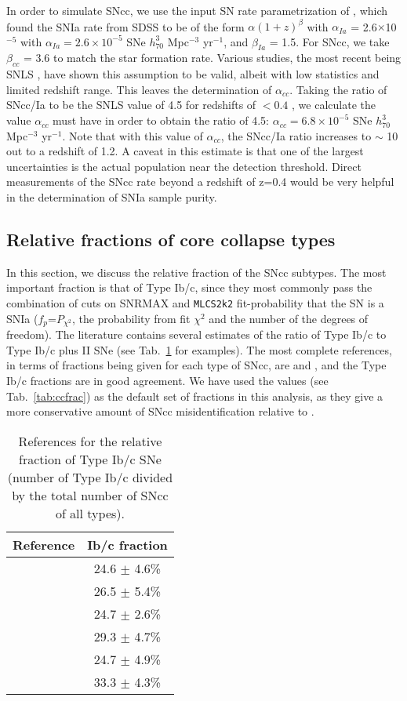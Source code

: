 \documentclass[preprint2]{aastex}    %
\newcommand{\mlcs}{{\tt MLCS2k2}}
\begin{document}
In order to simulate SNcc, we use the input
SN rate parametrization of \cite{dil08}, which found the SNIa rate from SDSS to be of the
form $\alpha(1+z)^{\beta}$ with $\alpha_{Ia}$ = 2.6$\times$10$^{-5}$
with $\alpha_{Ia} = 2.6\times 10^{-5}$ SNe $h_{70}^{3}$ 
Mpc$^{-3}$ yr$^{-1}$, 
and $\beta_{Ia}$ = 1.5. For SNcc, we take $\beta_{cc}$ = 3.6 to match
the star formation rate. Various studies, the most recent being
SNLS \citep{baz09}, have shown this assumption to be valid,
albeit with low statistics and limited redshift range.  This
leaves the determination of $\alpha_{cc}$. Taking the ratio of
SNcc/Ia to be the SNLS value of 4.5 for redshifts of $<0.4$ \citep{baz09}, we
calculate the value $\alpha_{cc}$ must have in order to obtain the ratio of 4.5:  
$\alpha_{cc} = 6.8\times 10^{-5}$ SNe $h_{70}^{3}$ 
Mpc$^{-3}$ yr$^{-1}$.
Note that with this value of $\alpha_{cc}$, the SNcc/Ia ratio increases to $\sim$ 10 out to a 
redshift of 1.2. 
A caveat in this estimate is 
that one of the largest uncertainties is the actual population near the detection threshold. 
Direct measurements of the 
SNcc rate beyond a redshift of z=0.4 would be very helpful in the determination of 
SNIa sample purity.

\subsection{Relative fractions of core collapse types}

In this section, we discuss the relative fraction of the SNcc subtypes.
The most important fraction is that of Type Ib/c, since they most commonly pass
the combination of cuts on SNRMAX and {\mlcs} fit-probability that the SN is a SNIa ($f_p$=$P_{\chi^2}$, the probability from fit $\chi^2$ and the number of the degrees of freedom).
The literature contains several estimates of the ratio of Type Ib/c to Type Ib/c
plus II SNe (see Tab.~\ref{tab:Ibcfraction} for examples). 
The most complete references, in terms of fractions being given for each type of SNcc, are \cite{li11} and \cite{sma09}, and the Type Ib/c fractions
are in good agreement. We have used the \cite{sma09} values (see Tab.~\ref{tab:ccfrac})
as the default set of fractions in this analysis, as they give a more 
conservative amount of SNcc misidentification relative to \cite{li11}.

\begin{table}[h]
\centering%
\begin{tabular}
[c]{|c|c|}\hline
Reference & Ib/c fraction\\
\hline
\cite{li11} & 24.6 $\pm$ 4.6\% \\
\cite{li07} & 26.5 $\pm$ 5.4\% \\
\cite{van05} & 24.7 $\pm$ 2.6\% \\
\cite{sma09} & 29.3 $\pm$ 4.7\% \\
\cite{pri08} & 24.7 $\pm$ 4.9\% \\
\cite{lea09} & 33.3 $\pm$ 4.3\% \\
\hline
\end{tabular}
\caption{References for the relative fraction of Type Ib/c SNe (number of Type Ib/c divided by
the total number of SNcc of all types).}
\label{tab:Ibcfraction}%
\end{table}
\end{document}
